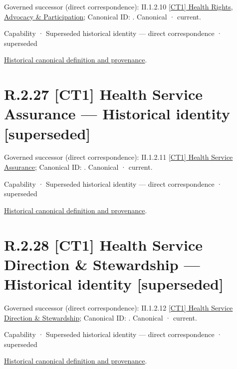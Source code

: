 {\small Governed successor (direct correspondence): II.1.2.10 \hyperref[element:7ab5c82a500b45f39267883a6e78c482]{[CT1] Health Rights, Advocacy \& Participation}; Canonical ID: \texttt{}. Canonical · current.}\par
\label{element:58376e5c53bf4af0a54f99f21ac52666}
{\small Capability · Superseded historical identity — direct correspondence · superseded}\par
\href{../../../../continuum/strategy/capability/58376e5c53bf4af0a54f99f21ac52666.md}{Historical canonical definition and provenance}.\par
\section*{R.2.27 [CT1] Health Service Assurance — Historical identity [superseded]}
\label{navigation:R.2.27}

{\small Governed successor (direct correspondence): II.1.2.11 \hyperref[element:14860102964c441681d41ec3da423fe0]{[CT1] Health Service Assurance}; Canonical ID: \texttt{}. Canonical · current.}\par
\label{element:6a82dc1423374e809dbf542eeaa69482}
{\small Capability · Superseded historical identity — direct correspondence · superseded}\par
\href{../../../../continuum/strategy/capability/6a82dc1423374e809dbf542eeaa69482.md}{Historical canonical definition and provenance}.\par
\section*{R.2.28 [CT1] Health Service Direction \& Stewardship — Historical identity [superseded]}
\label{navigation:R.2.28}

{\small Governed successor (direct correspondence): II.1.2.12 \hyperref[element:d51e7125bf9c4d2c9c59b60346b4d86f]{[CT1] Health Service Direction \& Stewardship}; Canonical ID: \texttt{}. Canonical · current.}\par
\label{element:360bf50f92484448a01cc57f2dbce23c}
{\small Capability · Superseded historical identity — direct correspondence · superseded}\par
\href{../../../../continuum/strategy/capability/360bf50f92484448a01cc57f2dbce23c.md}{Historical canonical definition and provenance}.\par
